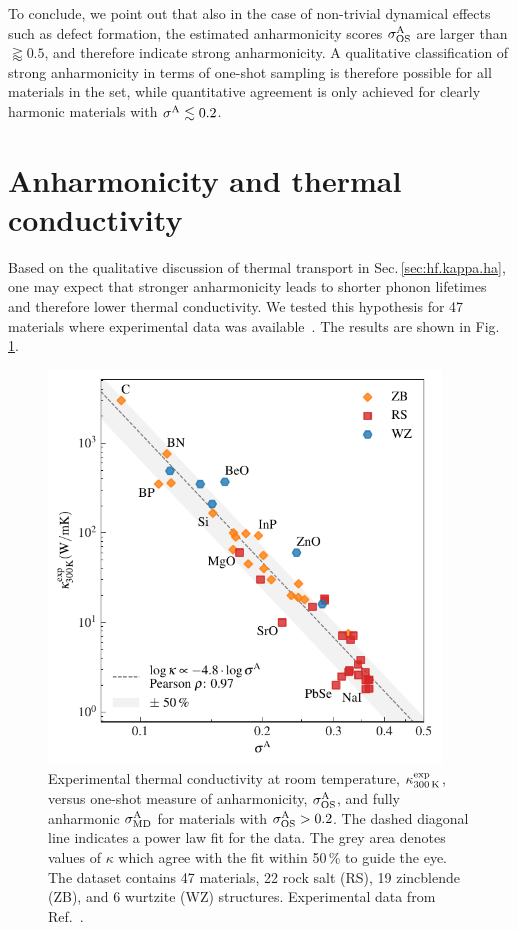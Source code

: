To conclude, we point out that also in the case of non-trivial dynamical effects such as defect formation, the estimated anharmonicity scores $\sigma^\mathrm{A}_\mathrm{OS}$ are larger than $\gtrapprox 0.5$, and therefore indicate strong anharmonicity. A qualitative classification of strong anharmonicity in terms of one-shot sampling is therefore possible for all materials in the set, while quantitative agreement is only achieved for clearly harmonic materials with $\sigma^\mathrm{A} \lesssim 0.2$.


\section{Anharmonicity and thermal conductivity}
\label{sec:kappa_vs_sigmaA}

Based on the qualitative discussion of thermal transport in Sec.\,\ref{sec:hf.kappa.ha}, one may expect that stronger anharmonicity leads to shorter phonon lifetimes and therefore lower thermal conductivity. We tested this hypothesis for 47 materials where experimental data was available~\cite{Morelli.2006,Chen.2019}. The results are shown in Fig.\,\ref{fig:anh.kappa}.
%
\begin{figure}
	\includegraphics[width=4.1in]{./data/plots/anharmonicity/9_kappa/sigma_vs_kappa.pdf}
	\caption{
		Experimental thermal conductivity at room temperature, $\kappa^{\rm exp}_{300\,{\rm K}}$, versus one-shot measure of anharmonicity, $\sigma^\mathrm{A}_\mathrm{OS}$, and fully anharmonic $\sigma^\mathrm{A}_\mathrm{MD}$ for materials with $\sigma^\mathrm{A}_\mathrm{OS} > 0.2$. 
		The dashed diagonal line indicates a power law fit for the data. The grey area denotes values of $\kappa$ which agree with the fit within 50\,\% to guide the eye. The dataset contains 47 materials, 22 rock salt (RS), 19 zincblende (ZB), and 6 wurtzite (WZ) structures. Experimental data from Ref.~\cite{Morelli.2006,Chen.2019}.
	}
	\label{fig:anh.kappa}
\end{figure}


